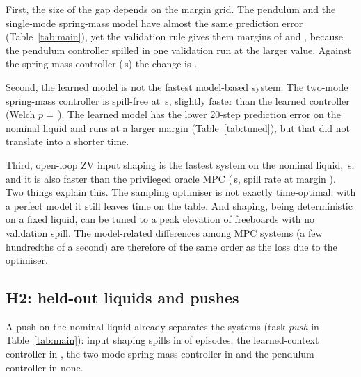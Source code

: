 First, the size of the gap depends on the margin grid. The pendulum and the single-mode spring-mass model have almost the same prediction error (Table~\ref{tab:main}), yet the validation rule gives them margins of  and , because the pendulum controller spilled in one validation run at the larger value. Against the spring-mass controller (\,s) the change is .

Second, the learned model is not the fastest model-based system. The two-mode spring-mass controller is spill-free at \,s, slightly faster than the learned controller (Welch $p=\,$). The learned model has the lower 20-step prediction error on the nominal liquid and runs at a larger margin (Table~\ref{tab:tuned}), but that did not translate into a shorter time.

Third, open-loop ZV input shaping is the fastest system on the nominal liquid, \,s, and it is also faster than the privileged oracle MPC (\,s, spill rate  at margin ). Two things explain this. The sampling optimiser is not exactly time-optimal: with a perfect model it still leaves time on the table. And shaping, being deterministic on a fixed liquid, can be tuned to a peak elevation of  freeboards with no validation spill. The model-related differences among MPC systems (a few hundredths of a second) are therefore of the same order as the loss due to the optimiser.

\subsection{H2: held-out liquids and pushes}
A push on the nominal liquid already separates the systems (task \emph{push} in Table~\ref{tab:main}): input shaping spills in  of episodes, the learned-context controller in , the two-mode spring-mass controller in  and the pendulum controller in none.

